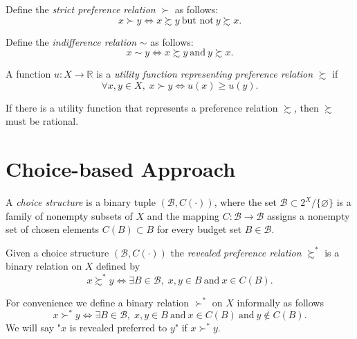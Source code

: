 \documentclass[12pt,fleqn]{book} %
\begin{document}
\begin{definition}
	Define the \emph{strict preference relation} $\succ$ as follows:
	\[	
	x\succ y \Longleftrightarrow x\succsim y \ \text{but not}\  y\succsim x.
	\]
\end{definition}

\begin{definition}
	Define the \emph{indifference relation} $\sim$ as follows:
	\[	
	x\sim y \Longleftrightarrow x\succsim y \ \text{and}\  y\succsim x.
	\]
\end{definition}

\begin{definition}
    A function $u:X\rightarrow\mathbb{R}$ is a \emph{utility function representing preference relation} $\succsim$ if
    \[
    \forall x,y\in X,\;x\succ y\Longleftrightarrow u(x)\ge u(y).
    \]
\end{definition}

\begin{proposition}
	If there is a utility function that represents a preference relation $\succsim$, then $\succsim$ must be rational. 
\end{proposition}


\section{Choice-based Approach}

\begin{definition}
	A \emph{choice structure} is a binary tuple $(\mathcal{B},C(\cdot))$, where the set $\mathcal{B}\subset 2^X\slash \{\varnothing\}$ is a family of nonempty subsets of $X$ and the mapping $C:\mathcal{B}\rightarrow \mathcal{B}$ assigns a nonempty set of chosen elements $C(B)\subset B$ for every budget set $B\in\mathcal{B}$.
\end{definition}

\begin{definition}
	Given a choice structure $(\mathcal{B},C(\cdot))$ the \emph{revealed preference relation} $\succsim^*$ is a binary relation on $X$ defined by
	\[
	x\succsim^*y\Longleftrightarrow \exists B\in\mathcal{B},\;x,y\in B \ \text{and}\  x\in C(B).
	\]
\end{definition}

\begin{remark}
	For convenience we define a binary relation $\succ^*$ on $X$ informally as follows 
	\[
	x\succ^*y\Longleftrightarrow \exists B\in\mathcal{B},\;x,y\in B \ \text{and}\  x\in C(B) \ \text{and}\ y\notin C(B).
	\]
	We will say "$x$ is revealed preferred to $y$" if $x\succ^*y$.
\end{remark}
\end{document}
